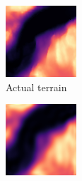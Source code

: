 \documentclass[a4paper,twocolumn]{article}
\begin{document}
\begin{figure}
    \centering
    \begin{subfigure}[b]{0.5\columnwidth}
        \includegraphics[width=\columnwidth]{terrain_subset.png}
        \caption{Actual terrain}
    \end{subfigure}\hspace{0.2cm}
    \begin{subfigure}[b]{0.5\columnwidth}
        \includegraphics[width=\columnwidth]{terrain_predict.png}

\end{subfigure}
\end{figure}
\end{document}

